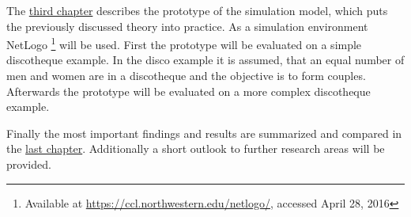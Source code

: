 The \hyperref[prototype]{third chapter} describes the prototype of the simulation model, which puts the previously discussed theory into practice. 
As a simulation environment NetLogo \footnote{Available at \url{https://ccl.northwestern.edu/netlogo/}, accessed April 28, 2016} will be used.
First the prototype will be evaluated on a simple discotheque example.
In the disco example it is assumed, that an equal number of men and women are in a discotheque and the objective is to form couples.
Afterwards the prototype will be evaluated on a more complex discotheque example.

Finally the most important findings and results are summarized and compared in the \hyperref[summary]{last chapter}.
Additionally a short outlook to further research areas will be provided.
